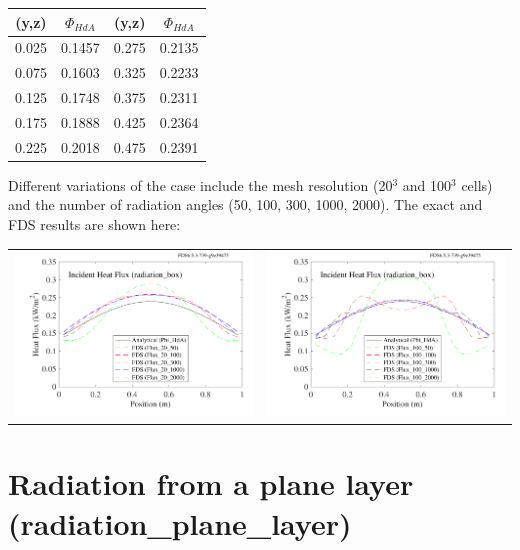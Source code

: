 \documentclass[11pt]{book}
\begin{document}
\begin{center}
\begin{tabular}{|c|c|c|c|}
\hline (y,z) & $\Phi_{HdA}$ & (y,z) & $\Phi_{HdA}$ \\ \hline \hline
0.025   &0.1457 & 0.275 &0.2135 \\
0.075   &0.1603 & 0.325 &0.2233 \\
0.125   &0.1748 & 0.375 &0.2311 \\
0.175   &0.1888 & 0.425 &0.2364 \\
0.225   &0.2018 & 0.475 &0.2391 \\ \hline
\end{tabular}
\end{center}

\noindent Different variations of the case include the mesh resolution (20$^3$ and 100$^3$ cells) and the number of radiation angles (50, 100, 300,
1000, 2000). The exact and FDS results are shown here:

\noindent
\begin{tabular*}{\textwidth}{lr}
\includegraphics[width=3.2in]{SCRIPT_FIGURES/radiation_box_20} &
\includegraphics[width=3.2in]{SCRIPT_FIGURES/radiation_box_100}
\end{tabular*}





\clearpage

\section{Radiation from a plane layer (\texorpdfstring{{\bf radiation\_plane\_layer}}{radiation\_plane\_layer})}
\label{radiation_plane_layer}
\end{document}
